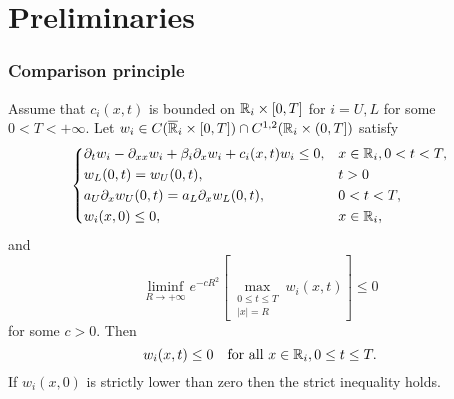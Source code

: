 \section{Preliminaries}


\begin{frame}[allowframebreaks]
    \frametitle{Comparison principle}
    \begin{lemma}
        Assume that \(c_i(x,t)\) is bounded on \(\mathbb{R}_i \times [0, T]\) for \(i = U, L\) for some \(0 < T < +\infty\). Let \(w_i \in C(\overline{\mathbb{R}}_i \times [0, T]) \cap C^{1,2}(\mathbb{R}_i \times (0, T])\) satisfy
        \begin{equation*}
            \begin{dcases}
                \partial_t w_i - \partial_{xx} w_i + \beta_i \partial_x w_i + c_i(x,t)w_i \leq 0, & x \in \mathbb{R}_i, 0 < t < T, \\
                w_L(0, t) = w_{U}(0, t), & t > 0 \\
                a_{U} \partial_x w_{U}(0, t) = a_L \partial_x w_L(0, t), & 0 < t < T, \\
                w_i(x, 0) \leq 0, & x \in \mathbb{R}_i,
            \end{dcases}
        \end{equation*}
        \theorembreak
        and 
        \begin{equation}
            \liminf_{R \to +\infty} e^{-cR^2}\left[\max_{\substack{0\leq t\leq T \\ \lvert x \rvert = R}} w_i(x,t)\right] \leq 0
            \label{eq:2.1}
        \end{equation}
        for some \(c > 0\). Then
        \[
            w_i(x,t) \leq 0 \quad \text{for all } x \in \mathbb{R}_i, 0 \leq t \leq T.
        \]
        If \(w_i(x,0)\) is strictly lower than zero then the strict inequality holds. 
        \label{lem:2.1}
    \end{lemma}
\end{frame}


